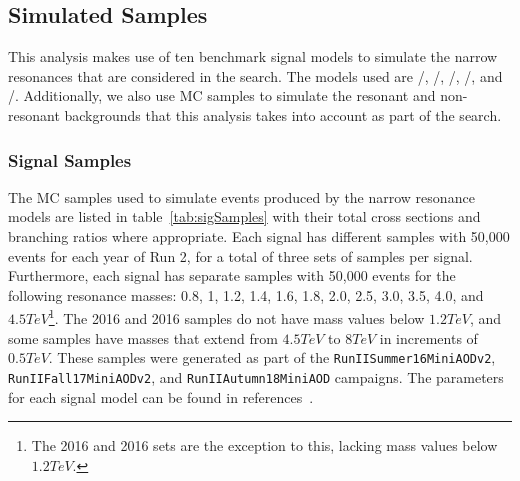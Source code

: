 %  
%
%  


\subsection{Simulated Samples}
\label{sec:simSamples}

This analysis makes use of ten benchmark signal models to simulate the narrow resonances that are considered in the search.
The models used are \ggF/\VBF\GBulktoWWtolnuqqbarpr, \ggF/\VBF\RadtoWWtolnuqqbarpr, \DY/\VBF\WprtoWZtolnuqqbar, \DY/\VBF\WprtoWHtolnubbbar, and \DY/\VBF\ZprtoWWtolnuqqbarpr.
Additionally, we also use MC samples to simulate the resonant and non-resonant backgrounds that this analysis takes into account as part of the search.

\subsubsection{Signal Samples}

The MC samples used to simulate events produced by the narrow resonance models are listed in table~\ref{tab:sigSamples} with their total cross sections and branching ratios where appropriate.
Each signal has different samples with 50,000 events for each year of Run 2, for a total of three sets of samples per signal.
Furthermore, each signal has separate samples with 50,000 events for the following resonance masses: 0.8, 1, 1.2, 1.4, 1.6, 1.8, 2.0, 2.5, 3.0, 3.5, 4.0, and $4.5\unit{TeV}$\footnote{The 2016 \VBF\ZprtoWW and 2016 \VBF\WprtoWZ sets are the exception to this, lacking mass values below $1.2\unit{TeV}$.}.
The 2016 \VBF\ZprtoWW and 2016 \VBF\WprtoWZ samples do not have mass values below $1.2\unit{TeV}$, and some samples have masses that extend from $4.5\unit{TeV}$ to $8\unit{TeV}$ in increments of $0.5\unit{TeV}$.
These samples were generated as part of the \texttt{RunIISummer16MiniAODv2}, \texttt{RunIIFall17MiniAODv2}, and \texttt{RunIIAutumn18MiniAOD} campaigns.
The parameters for each signal model can be found in references~\cite{git:BulkGrav_WW,git:Wpr_WZ,git:Wpr_WH,git:VBFRad_WW}.

